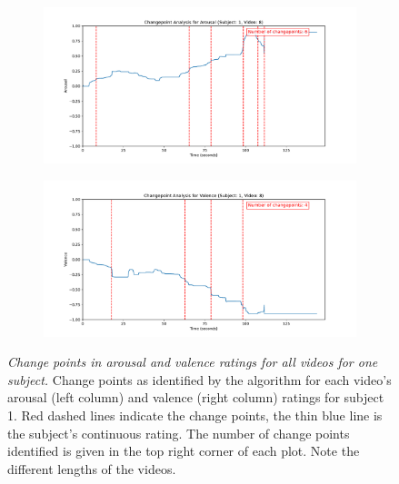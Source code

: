 \documentclass[11pt, letterpaper]{article}
\begin{document}
\begin{figure}
        \centering
    \begin{subfigure}[t]{0.49\textwidth}
        \centering
        \includegraphics[width=\linewidth]{sub_1_changepoints_V8_arousal} 
        \caption{} \label{fig:sub_1_changepoints_V8_arousal}
    \end{subfigure}
    \hfill
    \begin{subfigure}[t]{0.49\textwidth}
        \centering
        \includegraphics[width=\linewidth]{sub_1_changepoints_V8_valence} 
        \caption{} \label{fig:sub_1_changepoints_V8_valence}
    \end{subfigure}

    \vspace{1cm}
    
    \caption{\textit{Change points in arousal and valence ratings for all videos for one subject.} Change points as identified by the algorithm for each video's arousal (left column) and valence (right column) ratings for subject 1. Red dashed lines indicate the change points, the thin blue line is the subject's continuous rating. The number of change points identified is given in the top right corner of each plot. Note the different lengths of the videos.}
    \label{fig:sub1}
\end{figure}
\end{document}
